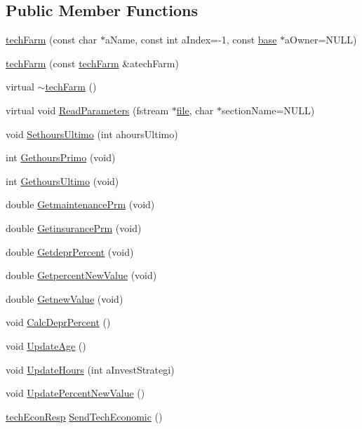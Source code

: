 \subsection*{Public Member Functions}
\begin{DoxyCompactItemize}
\item 
\hyperlink{classtech_farm_ae7e2f213d28d34dd5c79a8af8f17bb7c}{techFarm} (const char $\ast$aName, const int aIndex=-\/1, const \hyperlink{classbase}{base} $\ast$aOwner=NULL)
\item 
\hyperlink{classtech_farm_a9deb240c762e0410ccdf1027670bc093}{techFarm} (const \hyperlink{classtech_farm}{techFarm} \&atechFarm)
\item 
virtual \hyperlink{classtech_farm_acb6fb1867d18de12e43b7b28fe249240}{$\sim$techFarm} ()
\item 
virtual void \hyperlink{classtech_farm_aa64882b3e2248295d793274f75795707}{ReadParameters} (fstream $\ast$\hyperlink{classbase_a3af52ee9891719d09b8b19b42450b6f6}{file}, char $\ast$sectionName=NULL)
\item 
void \hyperlink{classtech_farm_a1cd9afb11ce12b93db384f6f7c6ad275}{SethoursUltimo} (int ahoursUltimo)
\item 
int \hyperlink{classtech_farm_ad61694fe36efc7411dbe4de32452a214}{GethoursPrimo} (void)
\item 
int \hyperlink{classtech_farm_aa35b82884aeaf19920b51eee73587026}{GethoursUltimo} (void)
\item 
double \hyperlink{classtech_farm_a6e04678c8e66f3e822a3e8b8a70f7294}{GetmaintenancePrm} (void)
\item 
double \hyperlink{classtech_farm_aec1e92fc836465da596ae5688a6c5609}{GetinsurancePrm} (void)
\item 
double \hyperlink{classtech_farm_a319874aeafaad8782ca855c681dba134}{GetdeprPercent} (void)
\item 
double \hyperlink{classtech_farm_a1dadfab669ff7b46fb97a3b338120784}{GetpercentNewValue} (void)
\item 
double \hyperlink{classtech_farm_aff350591013d647ad68bd19b10b6cd12}{GetnewValue} (void)
\item 
void \hyperlink{classtech_farm_a0a91f0c3a4542469ae9e3c72727636ab}{CalcDeprPercent} ()
\item 
void \hyperlink{classtech_farm_af44046acba4d8a743c290004a90e9af0}{UpdateAge} ()
\item 
void \hyperlink{classtech_farm_a7c57bf770a4d278b5584d42e9f05fab1}{UpdateHours} (int aInvestStrategi)
\item 
void \hyperlink{classtech_farm_a541165dae0993a19b3e1df68075e1a5b}{UpdatePercentNewValue} ()
\item 
\hyperlink{structtech_econ_resp}{techEconResp} \hyperlink{classtech_farm_a2c8c275684f7369e6d7388793d5a5b9c}{SendTechEconomic} ()
\end{DoxyCompactItemize}
